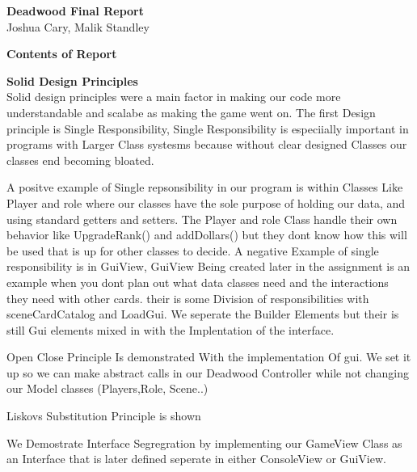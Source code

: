 \documentclass[12pt]{article}
\begin{document}
\setlength{\parindent}{10pt}
\setcounter{page}{1}
\singlespacing 

\begin{center}
\textbf{Deadwood Final Report}\\
Joshua Cary, Malik Standley
\end{center}
\doublespacing

\textbf{Contents of Report}
\begin{list}{}{}
\item[Solid Design Principles.] 
\item[Object Oriented Principles.]
\item[Design Patterns.]
\end{list}

\textbf {Solid Design Principles} \\

Solid design principles were a main factor in making our code more understandable and scalabe as making the game went on. 
	The first Design principle is Single Responsibility, Single Responsibility is especiially important in programs with Larger Class systesms because without clear designed Classes our classes end becoming bloated.
	
	 A positve example of Single repsonsibility in our program is within Classes Like Player and role where our classes have the sole purpose of holding our data, and using standard getters and setters. The Player and role Class handle their own behavior like UpgradeRank() and addDollars() but they dont know how this will be used that is up for other classes to decide. A negative Example of single responsibility is in GuiView, GuiView Being created later in the assignment is an example when you dont plan out what data classes need and the interactions they need with other cards. their is some Division of responsibilities with sceneCardCatalog and LoadGui. We seperate the Builder Elements but their is still Gui elements mixed in with the Implentation of the interface.
	
	 Open Close Principle Is demonstrated With the implementation Of gui. We set it up so we can make abstract calls in our Deadwood Controller while not changing our Model classes (Players,Role, Scene..) 

Liskovs Substitution Principle is shown

We Demostrate  Interface Segregration by implementing our GameView Class as an Interface that is later defined seperate in either ConsoleView or GuiView.
\end{document}
